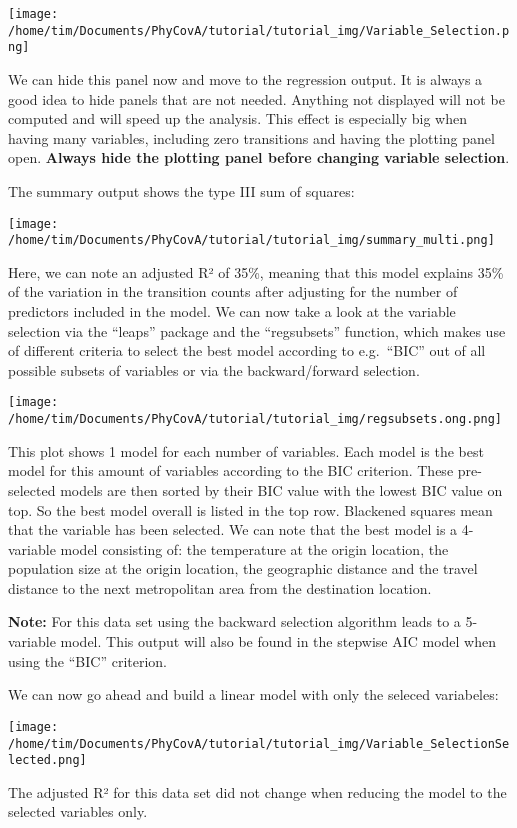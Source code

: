 \documentclass[
]{article}
\begin{document}
\texttt{[image: /home/tim/Documents/PhyCovA/tutorial/tutorial\_img/Variable\_Selection.png]}

We can hide this panel now and move to the regression output. It is
always a good idea to hide panels that are not needed. Anything not
displayed will not be computed and will speed up the analysis. This
effect is especially big when having many variables, including zero
transitions and having the plotting panel open. \textbf{Always hide the
plotting panel before changing variable selection}.

The summary output shows the type III sum of squares:

\texttt{[image: /home/tim/Documents/PhyCovA/tutorial/tutorial\_img/summary\_multi.png]}

Here, we can note an adjusted R² of 35\%, meaning that this model
explains 35\% of the variation in the transition counts after adjusting
for the number of predictors included in the model. We can now take a
look at the variable selection via the ``leaps'' package and the
``regsubsets'' function, which makes use of different criteria to select
the best model according to e.g.~``BIC'' out of all possible subsets of
variables or via the backward/forward selection.

\texttt{[image: /home/tim/Documents/PhyCovA/tutorial/tutorial\_img/regsubsets.ong.png]}

This plot shows 1 model for each number of variables. Each model is the
best model for this amount of variables according to the BIC criterion.
These pre-selected models are then sorted by their BIC value with the
lowest BIC value on top. So the best model overall is listed in the top
row. Blackened squares mean that the variable has been selected. We can
note that the best model is a 4-variable model consisting of: the
temperature at the origin location, the population size at the origin
location, the geographic distance and the travel distance to the next
metropolitan area from the destination location.

\textbf{Note:} For this data set using the backward selection algorithm
leads to a 5-variable model. This output will also be found in the
stepwise AIC model when using the ``BIC'' criterion.

We can now go ahead and build a linear model with only the seleced
variabeles:

\texttt{[image: /home/tim/Documents/PhyCovA/tutorial/tutorial\_img/Variable\_SelectionSelected.png]}

The adjusted R² for this data set did not change when reducing the model
to the selected variables only.
\end{document}
